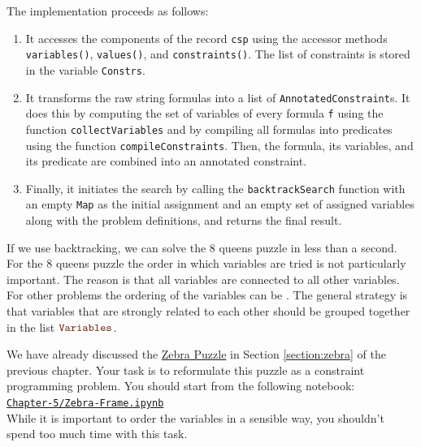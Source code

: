 \begin{enumerate}
  The implementation proceeds as follows:
  \begin{enumerate}
  \item It accesses the components of the record \texttt{csp} using the accessor methods
    \texttt{variables()}, \texttt{values()}, and \texttt{constraints()}.  The list of constraints is stored in
    the variable \texttt{Constrs}.
  \item It transforms the raw string formulas into a list of \texttt{AnnotatedConstraint}s. It does this by
    computing the set of variables of every formula \texttt{f} using the function \texttt{collectVariables} and
    by compiling all formulas into predicates using the function \texttt{compileConstraints}.  Then, the
    formula, its variables, and its predicate are combined into an annotated constraint. 
  \item Finally, it initiates the search by calling the \texttt{backtrackSearch} function with an empty
    \texttt{Map} as the initial assignment and an empty set of assigned variables along with the problem
    definitions, and returns the final result. 
  \end{enumerate}
\end{enumerate}

If we use backtracking, we can solve the 8 queens puzzle in less than a second.
For the 8 queens puzzle the order in which variables are tried is not particularly important.  The reason
is that all variables are connected to all other variables.  For other problems the ordering of the variables
can be .  The general strategy is that variables that are strongly related to each other should
be grouped together in the list $\mytt{Variables}$.

\exerciseEng
We have already discussed the \href{https://en.wikipedia.org/wiki/Zebra_puzzle}{Zebra Puzzle} in Section
\ref{section:zebra} of the previous chapter.  Your task is to reformulate this puzzle as a constraint
programming problem.  You should start from the following notebook:
\\[0.2cm]
\hspace*{1.3cm}
\href{https://github.com/karlstroetmann/Logic/blob/master/Java/Chapter-5/Zebra-Frame.ipynb}{\texttt{Chapter-5/Zebra-Frame.ipynb}}
\\[0.2cm]
While it is important to order the variables in a sensible way, you shouldn't spend too much time with this
task.
\eox

